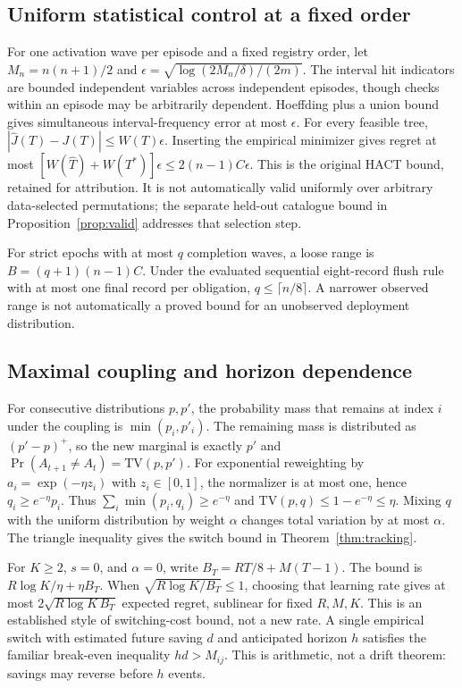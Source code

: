 \subsection{Uniform statistical control at a fixed order}
For one activation wave per episode and a fixed registry order, let
$M_n=n(n+1)/2$ and $\epsilon=\sqrt{\log(2M_n/\delta)/(2m)}$. The interval hit
indicators are bounded independent variables across independent episodes, though
checks within an episode may be arbitrarily dependent. Hoeffding plus a union bound
gives simultaneous interval-frequency error at most $\epsilon$. For every feasible
tree, $|\widehat J(T)-J(T)|\le W(T)\epsilon$. Inserting the empirical minimizer
gives regret at most $[W(\widehat T)+W(T^*)]\epsilon\le 2(n-1)C\epsilon$. This is
the original HACT bound, retained for attribution. It is not automatically valid
uniformly over arbitrary data-selected permutations; the separate held-out
catalogue bound in Proposition~\ref{prop:valid} addresses that selection step.

For strict epochs with at most $q$ completion waves, a loose range is
$B=(q+1)(n-1)C$. Under the evaluated sequential eight-record flush rule with at most
one final record per obligation, $q\le\lceil n/8\rceil$. A narrower observed range
is not automatically a proved bound for an unobserved deployment distribution.

\subsection{Maximal coupling and horizon dependence}
For consecutive distributions $p,p'$, the probability mass that remains at index
$i$ under the coupling is $\min(p_i,p'_i)$. The remaining mass is distributed as
$(p'-p)^+$, so the new marginal is exactly $p'$ and $\Pr(A_{t+1}\ne A_t)=\mathrm{TV}(p,p')$.
For exponential reweighting by $a_i=\exp(-\eta z_i)$ with $z_i\in[0,1]$, the
normalizer is at most one, hence $q_i\ge e^{-\eta}p_i$. Thus
$\sum_i\min(p_i,q_i)\ge e^{-\eta}$ and $\mathrm{TV}(p,q)\le1-e^{-\eta}\le\eta$.
Mixing $q$ with the uniform distribution by weight $\alpha$ changes total variation
by at most $\alpha$. The triangle inequality gives the switch bound in
Theorem~\ref{thm:tracking}.

For $K\ge2$, $s=0$, and $\alpha=0$, write $B_T=RT/8+M(T-1)$. The bound is
$R\log K/\eta+\eta B_T$. When $\sqrt{R\log K/B_T}\le1$, choosing that learning rate
gives at most $2\sqrt{R\log K\,B_T}$ expected regret, sublinear for fixed
$R,M,K$. This is an established style of switching-cost bound, not a new rate. A
single empirical switch with estimated future saving $d$ and anticipated horizon
$h$ satisfies the familiar break-even inequality $hd>M_{ij}$. This is arithmetic,
not a drift theorem: savings may reverse before $h$ events.

